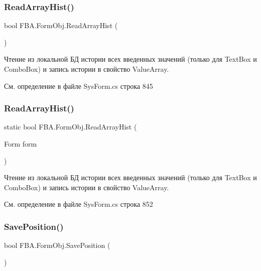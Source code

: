 \subsubsection{\texorpdfstring{Read\+Array\+Hist()}{ReadArrayHist()}\hspace{0.1cm}{\footnotesize\ttfamily [1/2]}}
{\footnotesize\ttfamily bool F\+B\+A.\+Form\+Obj.\+Read\+Array\+Hist (\begin{DoxyParamCaption}{ }\end{DoxyParamCaption})}

Чтение из локальной БД истории всех введенных значений (только для Text\+Box и Combo\+Box) и запись истории в свойство Value\+Array. 

См. определение в файле Sys\+Form.\+cs строка 845

\mbox{\label{class_f_b_a_1_1_form_obj_a2c37fc474e6c5dee9aabca7c07036e26}} 
\subsubsection{\texorpdfstring{Read\+Array\+Hist()}{ReadArrayHist()}\hspace{0.1cm}{\footnotesize\ttfamily [2/2]}}
{\footnotesize\ttfamily static bool F\+B\+A.\+Form\+Obj.\+Read\+Array\+Hist (\begin{DoxyParamCaption}\item[{Form}]{form }\end{DoxyParamCaption})\hspace{0.3cm}{\ttfamily [static]}}

Чтение из локальной БД истории всех введенных значений (только для Text\+Box и Combo\+Box) и запись истории в свойство Value\+Array. 

См. определение в файле Sys\+Form.\+cs строка 852

\mbox{\label{class_f_b_a_1_1_form_obj_ad381343106357bd57bf77be17a28a6a4}} 
\subsubsection{\texorpdfstring{Save\+Position()}{SavePosition()}}
{\footnotesize\ttfamily bool F\+B\+A.\+Form\+Obj.\+Save\+Position (\begin{DoxyParamCaption}{ }\end{DoxyParamCaption})}



